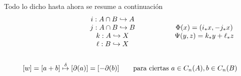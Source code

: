 \documentclass[spanish]{book}
\theoremstyle{definition}
\begin{document}
	Todo lo dicho hasta ahora se resume a continuación
	\begin{equation*}
	\begin{aligned}
	\begin{array}{c@{\hspace{2cm}}c}
			i:A\cap B\hookrightarrow A\\
			j:A\cap B\hookrightarrow B &\Phi(x)=(i_*x,-j_*x)\\
			k:A\hookrightarrow X&\Psi(y,z)=k_*y+\ell_*z\\
			\ell:B\hookrightarrow X
	\end{array}\\ \\
	[w]=[a+b]\overset{\delta}{\mapsto}[\partial(a)]=[-\partial(b)]\qquad\text{para ciertas }a\in C_n(A),b\in C_n(B)
	\end{aligned}
	\end{equation*}
\end{document}
